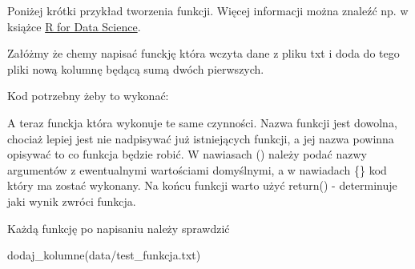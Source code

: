 \documentclass[
]{book}
\newenvironment{Shaded}{\begin{snugshade}}{\end{snugshade}}
\newcommand{\ControlFlowTok}[1]{\textcolor[rgb]{0.13,0.29,0.53}{\textbf{#1}}}
\newcommand{\FunctionTok}[1]{\textcolor[rgb]{0.00,0.00,0.00}{#1}}
\newcommand{\NormalTok}[1]{#1}
\newcommand{\OtherTok}[1]{\textcolor[rgb]{0.56,0.35,0.01}{#1}}
\newcommand{\SpecialCharTok}[1]{\textcolor[rgb]{0.00,0.00,0.00}{#1}}
\newcommand{\StringTok}[1]{\textcolor[rgb]{0.31,0.60,0.02}{#1}}
\begin{document}
Poniżej krótki przykład tworzenia funkcji. Więcej informacji można znaleźć np. w książce \href{https://r4ds.had.co.nz/functions.html}{R for Data Science}.

Załóżmy że chemy napisać funckję która wczyta dane z pliku txt i doda do tego pliki nową kolumnę będącą sumą dwóch pierwszych.

Kod potrzebny żeby to wykonać:

\begin{Shaded}
\end{Shaded}

A teraz funckja która wykonuje te same czynności. Nazwa funkcji jest dowolna, chociaż lepiej jest nie nadpisywać już istniejących funkcji, a jej nazwa powinna opisywać to co funkcja będzie robić. W nawiasach () należy podać nazwy argumentów z ewentualnymi wartościami domyślnymi, a w nawiadach \{\} kod który ma zostać wykonany. Na końcu funkcji warto użyć return() - determinuje jaki wynik zwróci funkcja.

\begin{Shaded}
\end{Shaded}

Każdą funkcję po napisaniu należy sprawdzić

\begin{Shaded}
\begin{Highlighting}[]
\FunctionTok{dodaj\_kolumne}\NormalTok{(}\StringTok{\textquotesingle{}data/test\_funkcja.txt\textquotesingle{}}\NormalTok{)}
\end{Highlighting}
\end{Shaded}
\end{document}
